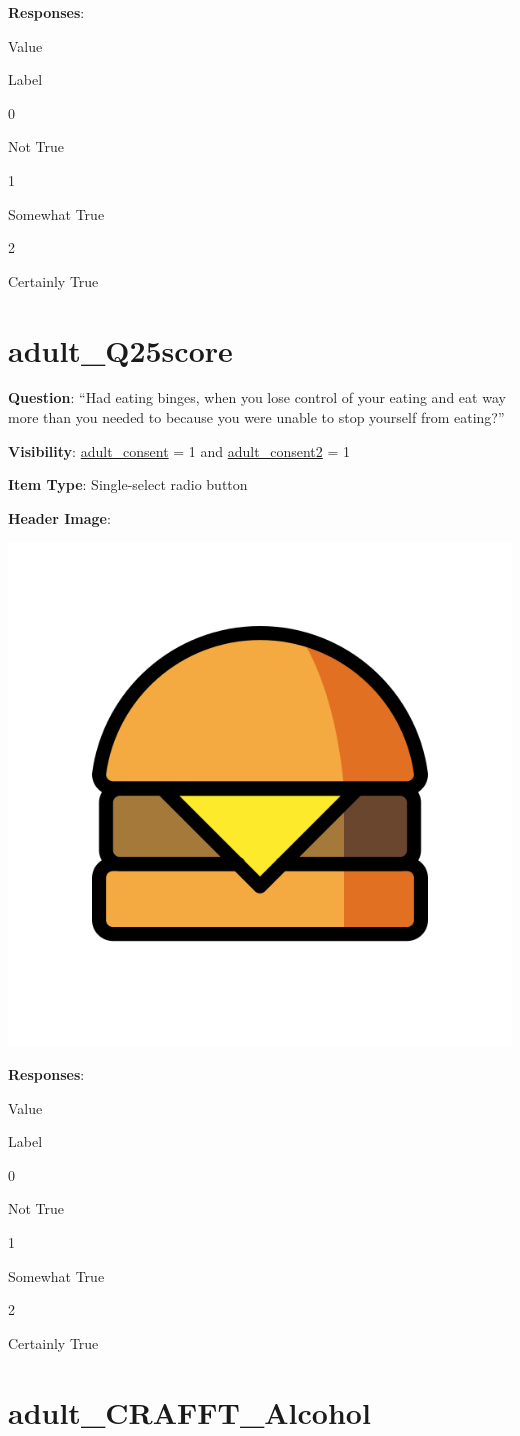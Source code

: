\documentclass[]{book}
\begin{document}
\textbf{Responses}:

Value

Label

0

Not True

1

Somewhat True

2

Certainly True

\hypertarget{adult_q25score}{%
\section{adult\_Q25score}\label{adult_q25score}}

\textbf{Question}: ``Had eating binges, when you lose control of your eating and eat way more than you needed to because you were unable to stop yourself from eating?''

\textbf{Visibility}: \protect\hyperlink{adult_consent}{adult\_consent} = 1 and \protect\hyperlink{adult_consent2}{adult\_consent2} = 1

\textbf{Item Type}: Single-select radio button

\textbf{Header Image}:

\begin{flushleft}\includegraphics[width=0.33\linewidth]{downloadFigs4latex_HBN_PMHS_Codebook/adult_Q25score_headerImg} \end{flushleft}

\textbf{Responses}:

Value

Label

0

Not True

1

Somewhat True

2

Certainly True

\hypertarget{adult_crafft_alcohol}{%
\section{adult\_CRAFFT\_Alcohol}\label{adult_crafft_alcohol}}
\end{document}
